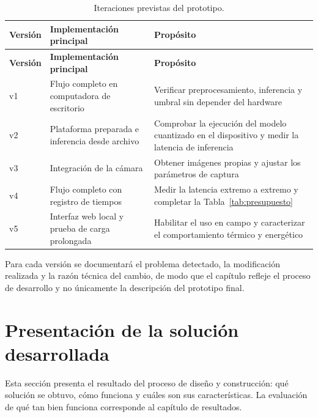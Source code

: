 \begin{longtable}{L{1.5cm}L{5.2cm}L{6.9cm}}
\caption{Iteraciones previstas del prototipo.}
\label{tab:iteraciones} \\
\toprule
\textbf{Versión} & \textbf{Implementación principal} & \textbf{Propósito} \\
\midrule
\endfirsthead
\toprule
\textbf{Versión} & \textbf{Implementación principal} & \textbf{Propósito} \\
\midrule
\endhead
v1 & Flujo completo en computadora de escritorio & Verificar preprocesamiento, inferencia y umbral sin depender del hardware \\
v2 & Plataforma preparada e inferencia desde archivo & Comprobar la ejecución del modelo cuantizado en el dispositivo y medir la latencia de inferencia \\
v3 & Integración de la cámara & Obtener imágenes propias y ajustar los parámetros de captura \\
v4 & Flujo completo con registro de tiempos & Medir la latencia extremo a extremo y completar la Tabla~\ref{tab:presupuesto} \\
v5 & Interfaz web local y prueba de carga prolongada & Habilitar el uso en campo y caracterizar el comportamiento térmico y energético \\
\bottomrule
\end{longtable}

Para cada versión se documentará el problema detectado, la modificación
realizada y la razón técnica del cambio, de modo que el capítulo refleje el
proceso de desarrollo y no únicamente la descripción del prototipo final.

\section{Presentación de la solución desarrollada}

Esta sección presenta el resultado del proceso de diseño y construcción: qué
solución se obtuvo, cómo funciona y cuáles son sus características. La
evaluación de qué tan bien funciona corresponde al capítulo de resultados.


